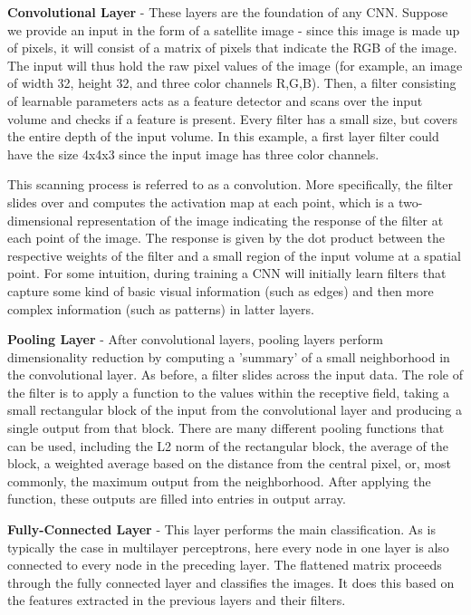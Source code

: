 \documentclass[11pt, a4paper, leqno]{article}
\begin{document}
\textbf{Convolutional Layer} - These layers are the foundation of any CNN. Suppose we provide an input in the form of a satellite image - since this image is made up of pixels, it will consist of a matrix of pixels that indicate the RGB of the image. The input will thus hold the raw pixel values of the image (for example, an image of width 32, height 32, and three color channels R,G,B). Then, a filter consisting of learnable parameters acts as a feature detector and scans over the input volume and checks if a feature is present. Every filter has a small size, but covers the entire depth of the input volume. In this example, a first layer filter could have the size 4x4x3 since the input image has three color channels. 

This scanning process is referred to as a convolution. More specifically, the filter slides over and computes the activation map at each point, which is a two-dimensional representation of the image indicating the response of the filter at each point of the image. The response is given by the dot product between the respective weights of the filter and a small region of the input volume at a spatial point. For some intuition, during training a CNN will initially learn filters that capture some kind of basic visual information (such as edges) and then more complex information (such as patterns) in latter layers. 

\textbf{Pooling Layer} - After convolutional layers, pooling layers perform dimensionality reduction by computing a 'summary' of a small neighborhood in the convolutional layer. As before, a filter slides across the input data. The role of the filter is to apply a function to the values within the receptive field, taking a small rectangular block of the input from the convolutional layer and producing a single output from that block. There are many different pooling functions that can be used, including the L2 norm of the rectangular block, the average of the block, a weighted average based on the distance from the central pixel, or, most commonly, the maximum output from the neighborhood. After applying the function, these outputs are filled into entries in output array. 

\textbf{Fully-Connected Layer} - This layer performs the main classification. As is typically the case in multilayer perceptrons, here every node in one layer is also connected to every node in the preceding layer. The flattened matrix proceeds through the fully connected layer and classifies the images. It does this based on the features extracted in the previous layers and their filters.
\end{document}
